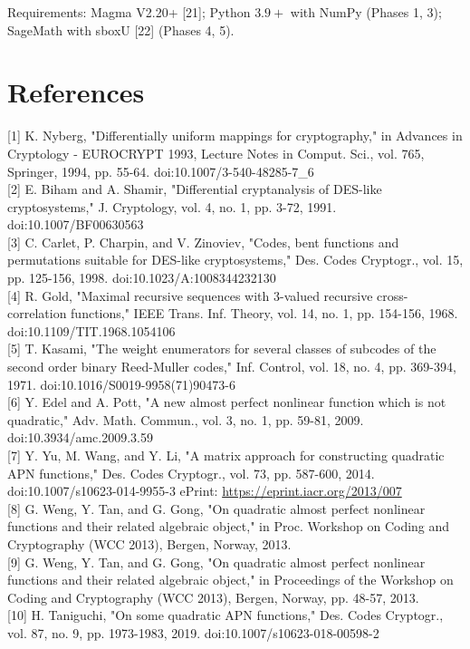 \documentclass[10pt]{article}
\begin{document}
Requirements: Magma V2.20+ [21]; Python $3.9+$ with NumPy (Phases 1, 3); SageMath with sboxU [22] (Phases 4, 5).

\section*{References}
[1] K. Nyberg, "Differentially uniform mappings for cryptography," in Advances in Cryptology - EUROCRYPT 1993, Lecture Notes in Comput. Sci., vol. 765, Springer, 1994, pp. 55-64. doi:10.1007/3-540-48285-7\_6\\[0pt]
[2] E. Biham and A. Shamir, "Differential cryptanalysis of DES-like cryptosystems," J. Cryptology, vol. 4, no. 1, pp. 3-72, 1991. doi:10.1007/BF00630563\\[0pt]
[3] C. Carlet, P. Charpin, and V. Zinoviev, "Codes, bent functions and permutations suitable for DES-like cryptosystems," Des. Codes Cryptogr., vol. 15, pp. 125-156, 1998. doi:10.1023/A:1008344232130\\[0pt]
[4] R. Gold, "Maximal recursive sequences with 3-valued recursive cross-correlation functions," IEEE Trans. Inf. Theory, vol. 14, no. 1, pp. 154-156, 1968. doi:10.1109/TIT.1968.1054106\\[0pt]
[5] T. Kasami, "The weight enumerators for several classes of subcodes of the second order binary Reed-Muller codes," Inf. Control, vol. 18, no. 4, pp. 369-394, 1971. doi:10.1016/S0019-9958(71)90473-6\\[0pt]
[6] Y. Edel and A. Pott, "A new almost perfect nonlinear function which is not quadratic," Adv. Math. Commun., vol. 3, no. 1, pp. 59-81, 2009. doi:10.3934/amc.2009.3.59\\[0pt]
[7] Y. Yu, M. Wang, and Y. Li, "A matrix approach for constructing quadratic APN functions," Des. Codes Cryptogr., vol. 73, pp. 587-600, 2014. doi:10.1007/s10623-014-9955-3 ePrint: \href{https://eprint.iacr.org/2013/007}{https://eprint.iacr.org/2013/007}\\[0pt]
[8] G. Weng, Y. Tan, and G. Gong, "On quadratic almost perfect nonlinear functions and their related algebraic object," in Proc. Workshop on Coding and Cryptography (WCC 2013), Bergen, Norway, 2013.\\[0pt]
[9] G. Weng, Y. Tan, and G. Gong, "On quadratic almost perfect nonlinear functions and their related algebraic object," in Proceedings of the Workshop on Coding and Cryptography (WCC 2013), Bergen, Norway, pp. 48-57, 2013.\\[0pt]
[10] H. Taniguchi, "On some quadratic APN functions," Des. Codes Cryptogr., vol. 87, no. 9, pp. 1973-1983, 2019. doi:10.1007/s10623-018-00598-2\\[0pt]
\end{document}
